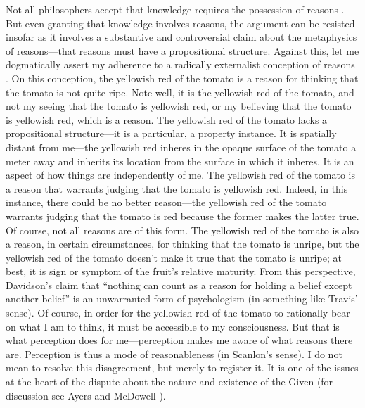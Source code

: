 \documentclass[12pt]{article}
\begin{document}
Not all philosophers accept that knowledge requires the possession of reasons \citep[see][]{Pryor:2007fk}. But even granting that knowledge involves reasons, the argument can be resisted insofar as it involves a substantive and controversial claim about the metaphysics of reasons---that reasons must have a propositional structure. Against this, let me dogmatically assert my adherence to a radically externalist conception of reasons \citep[see][]{Scanlon:1998hb,Raz:2000tm}. On this conception, the yellowish red of the tomato is a reason for thinking that the tomato is not quite ripe. Note well, it is the yellowish red of the tomato, and not my seeing that the tomato is yellowish red, or my believing that the tomato is yellowish red, which is a reason. The yellowish red of the tomato lacks a propositional structure---it is a particular, a property instance. It is spatially distant from me---the yellowish red inheres in the opaque surface of the tomato a meter away and inherits its location from the surface in which it inheres. It is an aspect of how things are independently of me. The yellowish red of the tomato is a reason that warrants judging that the tomato is yellowish red. Indeed, in this instance, there could be no better reason---the yellowish red of the tomato warrants judging that the tomato is red because the former makes the latter true. Of course, not all reasons are of this form. The yellowish red of the tomato is also a reason, in certain circumstances, for thinking that the tomato is unripe, but the yellowish red of the tomato doesn't make it true that the tomato is unripe; at best, it is sign or symptom of the fruit's relative maturity. From this perspective, Davidson's \citeyearpar[310]{Davidson:1986uq} claim that ``nothing can count as a reason for holding a belief except another belief'' is an unwarranted form of psychologism (in something like Travis' \citeyear{Travis:2006fk} sense). Of course, in order for the yellowish red of the tomato to rationally bear on what I am to think, it must be accessible to my consciousness. But that is what perception does for me---perception makes me aware of what reasons there are. Perception is thus a mode of reasonableness (in Scanlon's \citeyear[]{Scanlon:1998hb} sense). I do not mean to resolve this disagreement, but merely to register it. It is one of the issues at the heart of the dispute about the nature and existence of the Given (for discussion see Ayers \citeyear{Ayers:2004kx} and McDowell \citeyear{McDowell:2006vn}).
\end{document}
